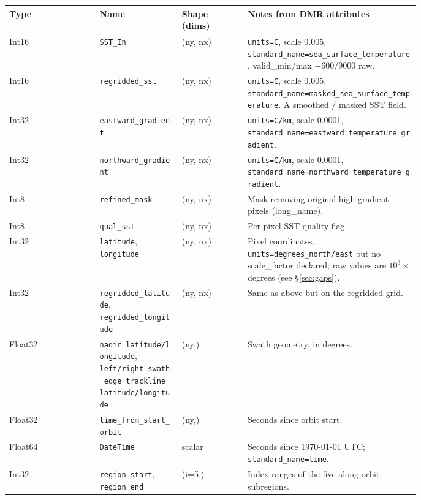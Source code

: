 \documentclass[11pt]{article}
\begin{document}
\begin{center}
\renewcommand{\arraystretch}{1.1}
\begin{tabular}{@{}lp{0.20\linewidth}p{0.16\linewidth}p{0.42\linewidth}@{}}
\toprule
Type & Name & Shape (dims) & Notes from DMR attributes \\
\midrule
Int16 & \texttt{SST\_In}                              & (ny, nx) & \texttt{units=C}, scale 0.005, \texttt{standard\_name=sea\_surface\_temperature}, valid\_min/max $-600/9000$ raw. \\
Int16 & \texttt{regridded\_sst}                       & (ny, nx) & \texttt{units=C}, scale 0.005, \texttt{standard\_name=masked\_sea\_surface\_temperature}. A smoothed / masked SST field. \\
Int32 & \texttt{eastward\_gradient}                   & (ny, nx) & \texttt{units=C/km}, scale 0.0001, \texttt{standard\_name=eastward\_temperature\_gradient}. \\
Int32 & \texttt{northward\_gradient}                  & (ny, nx) & \texttt{units=C/km}, scale 0.0001, \texttt{standard\_name=northward\_temperature\_gradient}. \\
Int8  & \texttt{refined\_mask}                        & (ny, nx) & Mask removing original high-gradient pixels (long\_name). \\
Int8  & \texttt{qual\_sst}                            & (ny, nx) & Per-pixel SST quality flag. \\
Int32 & \texttt{latitude}, \texttt{longitude}         & (ny, nx) & Pixel coordinates. \texttt{units=degrees\_north/east} but no scale\_factor declared; raw values are $10^3 \times$ degrees (see \S\ref{sec:gaps}). \\
Int32 & \texttt{regridded\_latitude}, \texttt{regridded\_longitude} & (ny, nx) & Same as above but on the regridded grid. \\
Float32 & \texttt{nadir\_latitude/longitude}, \texttt{left/right\_swath\_edge\_trackline\_latitude/longitude} & (ny,) & Swath geometry, in degrees. \\
Float32 & \texttt{time\_from\_start\_orbit}          & (ny,) & Seconds since orbit start. \\
Float64 & \texttt{DateTime}                          & scalar  & Seconds since 1970-01-01 UTC; \texttt{standard\_name=time}. \\
Int32   & \texttt{region\_start}, \texttt{region\_end} & (i=5,) & Index ranges of the five along-orbit subregions. \\
\bottomrule
\end{tabular}
\end{center}
\end{document}
